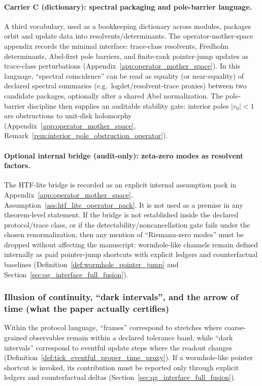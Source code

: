 \paragraph{Carrier C (dictionary): spectral packaging and pole-barrier language.}
\AuditTag A third vocabulary, used as a bookkeeping dictionary across modules, packages orbit and update data into resolvents/determinants.
The operator-mother-space appendix records the minimal interface: trace-class resolvents, Fredholm determinants, Abel-first pole barriers,
and finite-rank pointer-jump updates as trace-class perturbations (Appendix~\ref{app:operator_mother_space}).
In this language, ``spectral coincidence'' can be read as equality (or near-equality) of declared spectral summaries
(e.g.\ logdet/resolvent-trace proxies) between two candidate packages, optionally after a shared Abel normalization.
The pole-barrier discipline then supplies an auditable stability gate: interior poles $|r_0|<1$ are obstructions to unit-disk holomorphy
(Appendix~\ref{app:operator_mother_space}, Remark~\ref{rem:interior_pole_obstruction_operator}).

\paragraph{Optional internal bridge (audit-only): zeta-zero modes as resolvent factors.}
\AuditTag The HTF-lite bridge is recorded as an explicit internal assumption pack in Appendix~\ref{app:operator_mother_space},
Assumption~\ref{ass:htf_lite_operator_pack}.
It is not used as a premise in any theorem-level statement.
If the bridge is not established inside the declared protocol/trace class, or if the detectability/noncancellation gate fails under the chosen renormalization,
then any mention of ``Riemann-zero modes'' must be dropped without affecting the manuscript:
wormhole-like channels remain defined internally as paid pointer-jump shortcuts with explicit ledgers and counterfactual baselines
(Definition~\ref{def:wormhole_pointer_jump} and Section~\ref{sec:qg_interface_full_fusion}).

\subsubsection*{Illusion of continuity, ``dark intervals'', and the arrow of time (what the paper actually certifies)}
\AuditTag Within the protocol language, ``frames'' correspond to stretches where coarse-grained observables remain within a declared tolerance band,
while ``dark intervals'' correspond to eventful update steps where the readout changes (Definition~\ref{def:tick_eventful_proper_time_proxy}).
If a wormhole-like pointer shortcut is invoked, its contribution must be reported only through explicit ledgers and counterfactual deltas
(Section~\ref{sec:qg_interface_full_fusion}).

